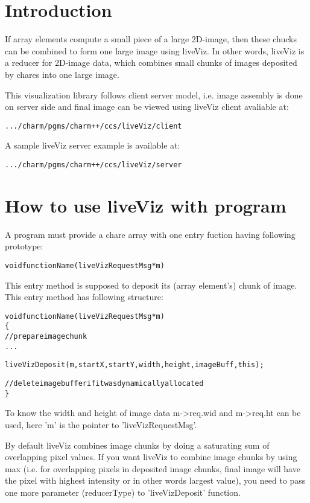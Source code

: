 \section{Introduction}

If array elements compute a small piece of a large 2D-image, then these 
chucks can be combined to form one large image using liveViz. In other 
words, liveViz is a reducer for 2D-image data, which combines small chunks
 of images deposited by chares into one large image.

This visualization library follows client server model, i.e. image 
assembly is done on server side and final image can be viewed using 
liveViz client avaliable at:
\begin{alltt}
           .../charm/pgms/charm++/ccs/liveViz/client
\end{alltt}

A sample liveViz server example is available at:
\begin{alltt}
           .../charm/pgms/charm++/ccs/liveViz/server
\end{alltt}

\section{How to use liveViz with \charmpp{} program}

A program must provide a chare array with one entry fuction having 
following prototype:

\begin{alltt}
  void functionName (liveVizRequestMsg *m)
\end{alltt}

This entry method is supposed to deposit its (array element's) chunk of 
image. This entry method has following structure:

\begin{alltt}
  void functionName (liveVizRequestMsg *m)
  \{
    // prepare image chunk
       ...

    liveVizDeposit (m, startX, startY, width, height, imageBuff, this);

    // delete image buffer if it was dynamically allocated
  \}
\end{alltt}

To know the width and height of image data m->req.wid and m->req.ht can 
be used, here 'm' is the pointer to 'liveVizRequestMsg'. 

By default liveViz combines image chunks by doing a saturating sum of 
overlapping pixel values. If you want liveViz to combine image chunks by using 
max (i.e. for overlapping pixels in deposited image chunks, final image will 
have the pixel with highest intensity or in other words largest value), you need
to pass one more parameter (reducerType) to 'liveVizDeposit' function.

